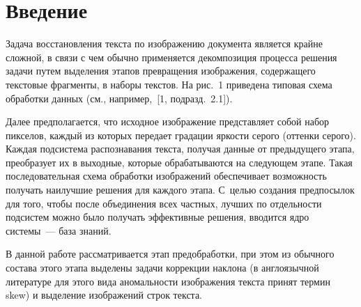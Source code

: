       \begin{multicols}{2}

            \label{st\stat}
            
\section{Введение}


      
      Задача восстановления текста по изображению документа является крайне 
сложной, в связи с чем обычно применяется декомпозиция процесса ре\-ше\-ния задачи 
путем выделения этапов превращения изображения, содержащего текстовые фрагмен\-ты, в 
наборы текстов. На рис.~1 приведена типовая схема обработки данных (см., например,~[1,
под\-разд.~2.1]).



      Далее предполагается, что исходное изображение представляет собой набор 
пикселов, каждый из которых передает градации яркости серого (оттенки серого). Каждая 
подсистема распознавания текста, получая данные от предыдущего этапа, преобразует их 
в выходные, которые обрабатываются на следующем этапе. Такая последовательная схема 
обработки изображений обеспечивает возможность получать наилучшие решения для 
каждого этапа. С~целью создания предпосылок для того, чтобы после объединения всех 
частных, лучших по отдельности подсистем можно было получать эффективные решения, 
вводится ядро системы~--- база знаний.
      
      В данной работе рассматривается этап предобработки, при этом из обычного 
состава этого этапа выделены задачи коррекции наклона (в англоязычной литературе для 
этого вида аномальности изоб\-ра\-же\-ния текста принят термин skew) и выделение 
изображений строк текста. 

\end{multicols}

\begin{figure}[h] %
\vspace*{-9pt}
 \begin{center}
 \mbox{%
 \epsfxsize=116.703mm
 }
 \end{center}
 \vspace*{-9pt}
\end{figure}


      
      \pagebreak
      
      \begin{figure} %
      \vspace*{1pt}
 \begin{center}
 \mbox{%
 \epsfxsize=160mm
 }
 \end{center}
 \vspace*{-9pt}
       \end{figure}
       
